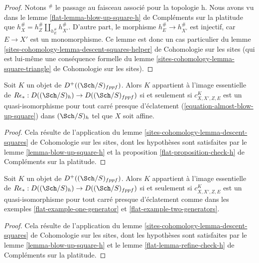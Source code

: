 \begin{proof}
Notons ${}^\#$ le passage au faisceau associé pour la topologie h.
Nous avons vu dans le lemme \ref{flat-lemma-blow-up-square-h} de Compléments sur la platitude
que $h_X^\# = h_Z^\# \amalg_{h_E^\#} h_{X'}^\#$. D'autre part,
le morphisme $h_E^\# \to h_{X'}^\#$ est injectif, car $E \to X'$ est un
monomorphisme. Ce lemme est donc un cas particulier du
lemme \ref{sites-cohomology-lemma-descent-squares-helper} de Cohomologie sur les sites
(qui est lui-même une conséquence formelle du
lemme \ref{sites-cohomology-lemma-square-triangle} de Cohomologie sur les sites).
\end{proof}

\begin{proposition}
\label{proposition-check-h}
Soit $K$ un objet de $D^+((\Sch/S)_{fppf})$.
Alors $K$ appartient à l'image essentielle de
$R\epsilon_* : D((\Sch/S)_h) \to D((\Sch/S)_{fppf})$
si et seulement si $c^K_{X, X', Z, E}$ est un quasi-isomorphisme
pour tout carré presque d'éclatement (\ref{equation-almost-blow-up-square})
dans $(\Sch/S)_h$ tel que $X$ soit affine.
\end{proposition}

\begin{proof}
Cela résulte de l'application du
lemme \ref{sites-cohomology-lemma-descent-squares} de Cohomologie sur les sites,
dont les hypothèses sont satisfaites par le
lemme \ref{lemma-blow-up-square-h} et la
proposition \ref{flat-proposition-check-h} de Compléments sur la platitude.
\end{proof}

\begin{lemma}
\label{lemma-refine-check-h}
Soit $K$ un objet de $D^+((\Sch/S)_{fppf})$. Alors $K$ appartient à
l'image essentielle de $R\epsilon_* : D((\Sch/S)_h) \to D((\Sch/S)_{fppf})$
si et seulement si $c^K_{X, X', Z, E}$ est un quasi-isomorphisme
pour tout carré presque d'éclatement comme dans les
exemples \ref{flat-example-one-generator} et
\ref{flat-example-two-generators}.
\end{lemma}

\begin{proof}
Cela résulte de l'application du
lemme \ref{sites-cohomology-lemma-descent-squares} de Cohomologie sur les sites,
dont les hypothèses sont satisfaites par le
lemme \ref{lemma-blow-up-square-h} et le
lemme \ref{flat-lemma-refine-check-h} de Compléments sur la platitude.
\end{proof}






